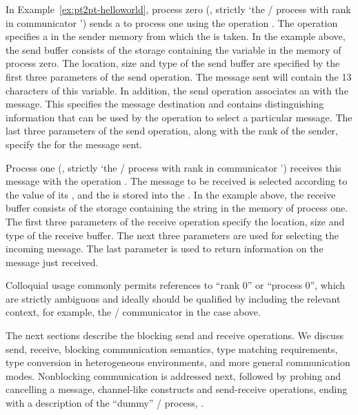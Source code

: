In Example~\ref{ex:pt2pt-helloworld}, process zero (, strictly `the \MPI/ process with rank  in communicator ') sends a  to process one
using the
 operation . The
operation specifies a  in the sender memory from which the
 is taken.  In the example above, the send buffer consists of the
storage containing the variable  in the memory of process zero.
The location, size and type of the send buffer are specified by the first three
parameters of the send operation.  The message sent will contain the 13
characters of this variable.
In addition, the send operation associates an  with the
message.  This  specifies the message destination and contains
distinguishing information that can be used by the  operation to
select a particular message.
The last three parameters of the send operation, along with the rank of the
sender,
specify the  for the message sent.

Process one (, strictly `the \MPI/ process with rank  in communicator ') receives this message with the
 operation .
The message to be received is selected according to the value of its
, and the  is stored into the
.
In the example above, the receive buffer consists of the storage
containing the string  in the memory of process one.
The first three parameters of the receive operation specify the location, size
and type of the receive buffer.  The next three
parameters are used for selecting the incoming message.  The last parameter is
used to return information on the message just received.

\begin{users}
 Colloquial usage commonly permits references to ``rank 0'' or ``process 0'',
 which are strictly ambiguous and ideally should be qualified by including
 the relevant context, for example, the \MPI/ communicator in the case above.
\end{users}

The next sections describe the blocking send and receive
operations.  We discuss send, receive, blocking communication semantics,
type matching requirements, type conversion in
heterogeneous environments, and more general communication modes.
Nonblocking communication is addressed next, followed by
probing and cancelling a message,
channel-like constructs and send-receive operations,
ending with a description of the
``dummy'' \MPI/ process, .

